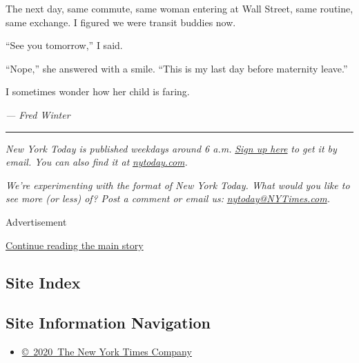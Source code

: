 The next day, same commute, same woman entering at Wall Street, same
routine, same exchange. I figured we were transit buddies now.

``See you tomorrow,'' I said.

``Nope,'' she answered with a smile. ``This is my last day before
maternity leave.''

I sometimes wonder how her child is faring.

\emph{--- Fred Winter}

\begin{center}\rule{0.5\linewidth}{\linethickness}\end{center}

\emph{New York Today is published weekdays around 6 a.m.}
\href{https://www.nytimes3xbfgragh.onion/newsletters/newyorktoday?module=inline}{\emph{Sign
up here}} \emph{to get it by email. You can also find it at}
\href{http://www.nytoday.com/}{\emph{nytoday.com}}\emph{.}

\emph{We're experimenting with the format of New York Today. What would
you like to see more (or less) of? Post a comment or email us:}
\href{mailto:nytoday@NYTimes.com}{\emph{nytoday@NYTimes.com}}\emph{.}

Advertisement

\protect\hyperlink{after-bottom}{Continue reading the main story}

\hypertarget{site-index}{%
\subsection{Site Index}\label{site-index}}

\hypertarget{site-information-navigation}{%
\subsection{Site Information
Navigation}\label{site-information-navigation}}

\begin{itemize}
\tightlist
\item
  \href{https://help.nytimes3xbfgragh.onion/hc/en-us/articles/115014792127-Copyright-notice}{©~2020~The
  New York Times Company}
\end{itemize}

